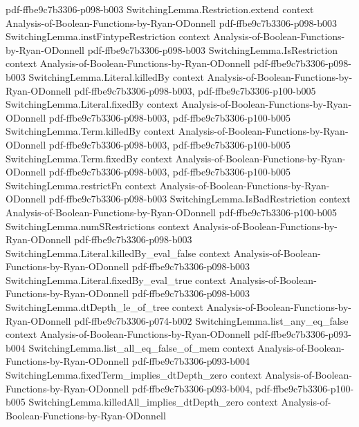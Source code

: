 \begin{theorem}
  {pdf-ffbe9c7b3306-p098-b003}
\proofstep
  {SwitchingLemma.Restriction.extend}
  {context}
  {Analysis-of-Boolean-Functions-by-Ryan-ODonnell}
  {pdf-ffbe9c7b3306-p098-b003}
\proofstep
  {SwitchingLemma.instFintypeRestriction}
  {context}
  {Analysis-of-Boolean-Functions-by-Ryan-ODonnell}
  {pdf-ffbe9c7b3306-p098-b003}
\proofstep
  {SwitchingLemma.IsRestriction}
  {context}
  {Analysis-of-Boolean-Functions-by-Ryan-ODonnell}
  {pdf-ffbe9c7b3306-p098-b003}
\proofstep
  {SwitchingLemma.Literal.killedBy}
  {context}
  {Analysis-of-Boolean-Functions-by-Ryan-ODonnell}
  {pdf-ffbe9c7b3306-p098-b003,
    pdf-ffbe9c7b3306-p100-b005}
\proofstep
  {SwitchingLemma.Literal.fixedBy}
  {context}
  {Analysis-of-Boolean-Functions-by-Ryan-ODonnell}
  {pdf-ffbe9c7b3306-p098-b003,
    pdf-ffbe9c7b3306-p100-b005}
\proofstep
  {SwitchingLemma.Term.killedBy}
  {context}
  {Analysis-of-Boolean-Functions-by-Ryan-ODonnell}
  {pdf-ffbe9c7b3306-p098-b003,
    pdf-ffbe9c7b3306-p100-b005}
\proofstep
  {SwitchingLemma.Term.fixedBy}
  {context}
  {Analysis-of-Boolean-Functions-by-Ryan-ODonnell}
  {pdf-ffbe9c7b3306-p098-b003,
    pdf-ffbe9c7b3306-p100-b005}
\proofstep
  {SwitchingLemma.restrictFn}
  {context}
  {Analysis-of-Boolean-Functions-by-Ryan-ODonnell}
  {pdf-ffbe9c7b3306-p098-b003}
\proofstep
  {SwitchingLemma.IsBadRestriction}
  {context}
  {Analysis-of-Boolean-Functions-by-Ryan-ODonnell}
  {pdf-ffbe9c7b3306-p100-b005}
\proofstep
  {SwitchingLemma.numSRestrictions}
  {context}
  {Analysis-of-Boolean-Functions-by-Ryan-ODonnell}
  {pdf-ffbe9c7b3306-p098-b003}
\proofstep
  {SwitchingLemma.Literal.killedBy_eval_false}
  {context}
  {Analysis-of-Boolean-Functions-by-Ryan-ODonnell}
  {pdf-ffbe9c7b3306-p098-b003}
\proofstep
  {SwitchingLemma.Literal.fixedBy_eval_true}
  {context}
  {Analysis-of-Boolean-Functions-by-Ryan-ODonnell}
  {pdf-ffbe9c7b3306-p098-b003}
\proofstep
  {SwitchingLemma.dtDepth_le_of_tree}
  {context}
  {Analysis-of-Boolean-Functions-by-Ryan-ODonnell}
  {pdf-ffbe9c7b3306-p074-b002}
\proofstep
  {SwitchingLemma.list_any_eq_false}
  {context}
  {Analysis-of-Boolean-Functions-by-Ryan-ODonnell}
  {pdf-ffbe9c7b3306-p093-b004}
\proofstep
  {SwitchingLemma.list_all_eq_false_of_mem}
  {context}
  {Analysis-of-Boolean-Functions-by-Ryan-ODonnell}
  {pdf-ffbe9c7b3306-p093-b004}
\proofstep
  {SwitchingLemma.fixedTerm_implies_dtDepth_zero}
  {context}
  {Analysis-of-Boolean-Functions-by-Ryan-ODonnell}
  {pdf-ffbe9c7b3306-p093-b004,
    pdf-ffbe9c7b3306-p100-b005}
\proofstep
  {SwitchingLemma.killedAll_implies_dtDepth_zero}
  {context}
  {Analysis-of-Boolean-Functions-by-Ryan-ODonnell}

\end{theorem}
